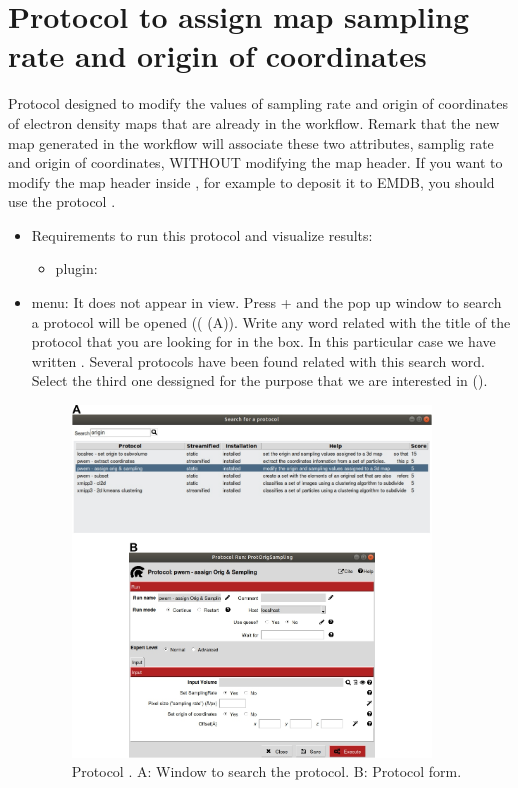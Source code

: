 \section{Protocol to assign map sampling rate and origin of coordinates}
\label{app:asignOrigAndSampling}%

Protocol designed to modify the values of sampling rate and origin of coordinates of electron density maps that are already in the \scipion workflow. Remark that the new map generated in the \scipion workflow will associate these two attributes, samplig rate and origin of coordinates, WITHOUT modifying the map header. If you want to modify the map header inside \scipion, for example to deposit it to EMDB, you should use the protocol .
   
 \begin{itemize}
  \item Requirements to run this protocol and visualize results:
    \begin{itemize}
        \item \scipion plugin: 
    \end{itemize}
  \item \scipion menu:
  It does not appear in  view.
  Press  +  and the pop up window to search a protocol will be opened (( (A)). Write any word related with the title of the protocol that you are looking for in the  box. In this particular case we have written . Several protocols have been found related with this search word. Select the third one dessigned for the purpose that we are interested in ().
  
    \begin{figure}[H]
    \centering 
    \captionsetup{width=.7\linewidth} 
    \includegraphics[width=0.90\textwidth]{Images_appendix/Fig301.pdf}
    \caption{Protocol . A: Window to search the protocol. B: Protocol form.}
    \label{fig:app_protocol_assign_orig_and_sampling}
   \end{figure}
  

\end{itemize}
